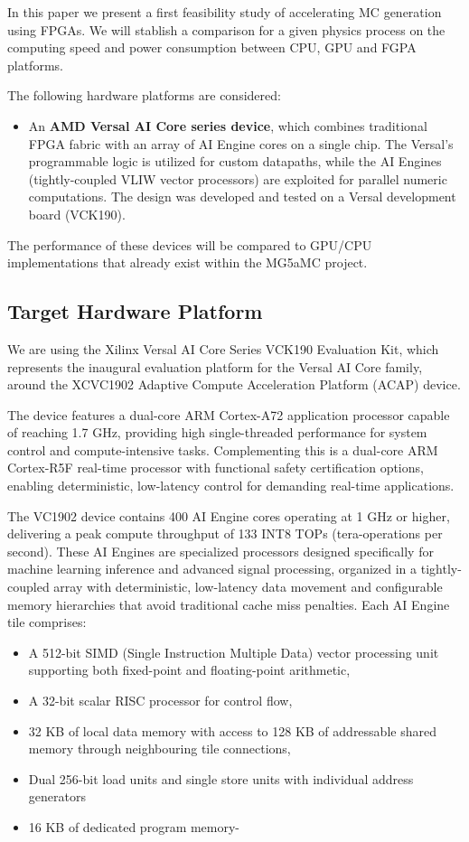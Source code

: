 In this paper we present a first feasibility study of accelerating MC generation using FPGAs. We will stablish a comparison for a given physics process on the computing speed and power consumption between CPU, GPU and FGPA platforms. 

The following hardware platforms are considered: 
\begin{itemize}
    \item An \textbf{AMD Versal AI Core series device}, which combines traditional FPGA fabric with an array of AI Engine cores on a single chip. The Versal’s programmable logic is utilized for custom datapaths, while the AI Engines (tightly-coupled VLIW vector processors) are exploited for parallel numeric computations. The design was developed and tested on a Versal development board (VCK190).
\end{itemize}

The performance of these devices will be compared to GPU/CPU implementations that already exist within the MG5aMC project. 

\subsection{Target Hardware Platform}
We are using the Xilinx Versal AI Core Series VCK190 Evaluation Kit, which represents the inaugural evaluation platform for the Versal AI Core family, around the XCVC1902 Adaptive Compute Acceleration Platform (ACAP) device. 

The device features a dual-core ARM Cortex-A72 application processor capable of reaching 1.7 GHz, providing high single-threaded performance for system control and compute-intensive tasks. Complementing this is a dual-core ARM Cortex-R5F real-time processor with functional safety certification options, enabling deterministic, low-latency control for demanding real-time applications. 

The VC1902 device contains 400 AI Engine cores operating at 1 GHz or higher, delivering a peak compute throughput of 133 INT8 TOPs (tera-operations per second). These AI Engines are specialized processors designed specifically for machine learning inference and advanced signal processing, organized in a tightly-coupled array with deterministic, low-latency data movement and configurable memory hierarchies that avoid traditional cache miss penalties. Each AI Engine tile comprises: 
\begin{itemize}
    \item A 512-bit SIMD (Single Instruction Multiple Data) vector processing unit supporting both fixed-point and floating-point arithmetic,
    \item A 32-bit scalar RISC processor for control flow,
    \item 32 KB of local data memory with access to 128 KB of addressable shared memory through neighbouring tile connections,
    \item Dual 256-bit load units and single store units with individual address generators
    \item 16 KB of dedicated program memory-
\end{itemize}

